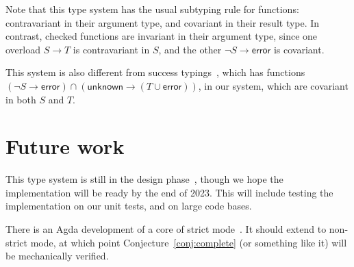 \documentclass[sigplan]{acmart}
\newcommand{\ERROR}{\mathsf{error}}
\newcommand{\UNKNOWN}{\mathsf{unknown}}
\newcommand{\fun}{\mathbin{\rightarrow}}
\begin{document}
Note that this type system has the usual subtyping rule for
functions: contravariant in their argument type, and
covariant in their result type. In contrast, checked functions
are invariant in their argument type, since one overload
$S \fun T$ is contravariant in $S$, and the other $\neg S \fun \ERROR$
is covariant.

This system is also different from  success
typings~\cite{SuccessTyping}, which has functions
$(\neg S \fun \ERROR) \cap (\UNKNOWN \fun (T \cup \ERROR))$,
in our system, which are covariant in both $S$ and $T$.

\section{Future work}

This type system is still in the design phase~\cite{NewNonStrictRFC}, though we hope
the implementation will be ready by the end of 2023. This will include
testing the implementation on our unit tests, and on large code bases.

There is an Agda development of a core of strict mode~\cite{BJ23:agda-typeck}.  It
should extend to non-strict mode, at which point
Conjecture~\ref{conj:complete} (or something like it)
will be mechanically verified.
  
 
\end{document}
